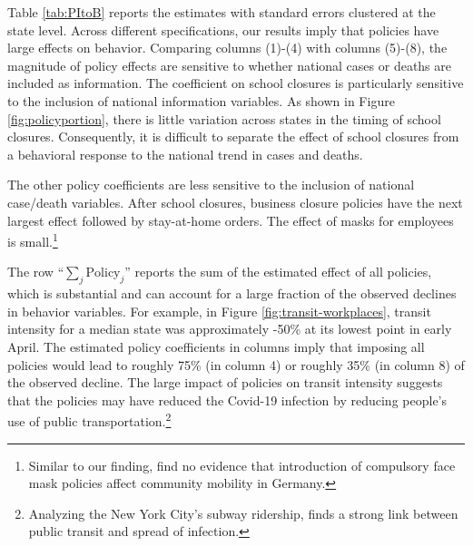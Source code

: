 \documentclass[11pt,reqno,letter]{amsart}
\theoremstyle{definition}
\begin{document}
Table \ref{tab:PItoB} reports the estimates  with standard errors clustered at the state level.  Across different
specifications, our results imply that policies have large effects on
behavior. Comparing columns (1)-(4) with columns (5)-(8),
the magnitude of policy effects are sensitive to whether national
cases or deaths are included as information. The coefficient on school
closures is particularly sensitive to the inclusion of national
information variables.  As shown in Figure
\ref{fig:policyportion}, there is little variation across states in
the timing of school closures. Consequently, it is difficult to
separate the effect of school closures from a behavioral response to the national
trend in cases and deaths.

The other policy coefficients are less sensitive to the inclusion of
national case/death variables. After school closures, business closure policies have the next largest effect followed by stay-at-home
orders.  The effect of masks for employees is
small.\footnote{Similar to our finding, \cite{kovacs2020} find no evidence that introduction of compulsory face mask policies affect community mobility in Germany.}




The row ``$\sum_j \mathrm{Policy}_j$'' reports the sum of the estimated
effect of all policies, which is substantial and can account for a
large fraction of the observed declines in behavior variables.  For
example,  in Figure \ref{fig:transit-workplaces}, transit intensity for a median state was approximately -50\% at its lowest point
 in early April. The estimated policy coefficients in columns imply
that imposing all policies would lead to roughly 75\% (in column
4) or roughly 35\% (in column 8) of the observed decline. The large impact of policies on transit intensity suggests that the policies may have reduced the Covid-19 infection by reducing people's use of public transportation.\footnote{Analyzing the New York City's subway ridership,  \cite{NBERw27021} finds  a strong link between public transit and spread of infection.}


\end{document}
